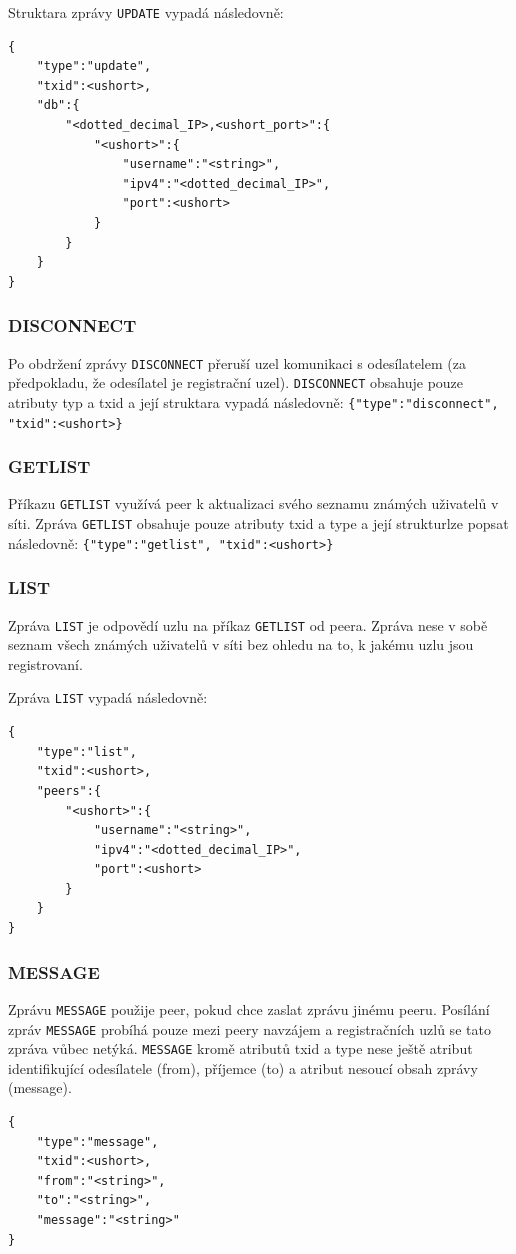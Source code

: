 \documentclass[11pt,a4paper,titlepage]{article}
\begin{document}
                Struktara zprávy \texttt{UPDATE} vypadá následovně:
\begin{verbatim}
{
    "type":"update",
    "txid":<ushort>,
    "db":{
        "<dotted_decimal_IP>,<ushort_port>":{
            "<ushort>":{
                "username":"<string>",
                "ipv4":"<dotted_decimal_IP>",
                "port":<ushort>
            }
        }
    }
}
\end{verbatim}

            \subsubsection{DISCONNECT}
                Po obdržení zprávy \texttt{DISCONNECT} přeruší uzel komunikaci s odesílatelem (za předpokladu, že odesílatel je registrační uzel).
                \texttt{DISCONNECT} obsahuje pouze atributy typ a txid a její struktara vypadá následovně: \verb+{"type":"disconnect", "txid":<ushort>}+
            \subsubsection*{GETLIST}
                Příkazu \texttt{GETLIST} využívá peer k aktualizaci svého seznamu známých uživatelů v síti. Zpráva \texttt{GETLIST} obsahuje pouze
                atributy txid a type a její strukturlze popsat následovně: \verb+{"type":"getlist", "txid":<ushort>}+
            \subsubsection{LIST}
                Zpráva \texttt{LIST} je odpovědí uzlu na příkaz \texttt{GETLIST} od peera. Zpráva nese v sobě seznam všech známých
                uživatelů v síti bez ohledu na to, k jakému uzlu jsou registrovaní.

                Zpráva \texttt{LIST} vypadá následovně:
\begin{verbatim}
{
    "type":"list",
    "txid":<ushort>,
    "peers":{
        "<ushort>":{
            "username":"<string>",
            "ipv4":"<dotted_decimal_IP>",
            "port":<ushort>
        }
    }
}
\end{verbatim}
            \subsubsection{MESSAGE}
                Zprávu \texttt{MESSAGE} použije peer, pokud chce zaslat zprávu jinému peeru. Posílání zpráv \texttt{MESSAGE}
                probíhá pouze mezi peery navzájem a registračních uzlů se tato zpráva vůbec netýká. \texttt{MESSAGE} kromě
                atributů txid a type nese ještě atribut identifikující odesílatele (from), příjemce (to) a atribut nesoucí obsah
                zprávy (message).
\begin{verbatim}
{
    "type":"message",
    "txid":<ushort>,
    "from":"<string>",
    "to":"<string>",
    "message":"<string>"
}
\end{verbatim}
\end{document}
